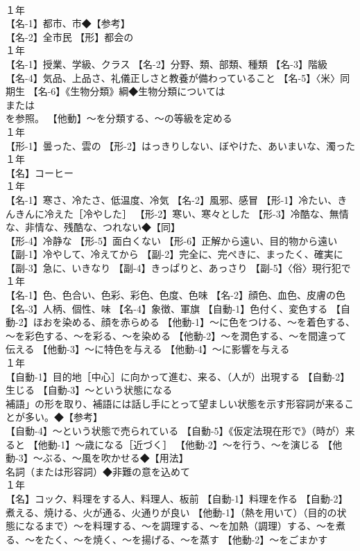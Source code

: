 \documentclass[8pt]{extreport}
\begin{document}
\begin{CJK}{UTF8}{min}
\\	１年	
\\	【名-1】都市、市◆【参考】
\\	【名-2】全市民 【形】都会の
\\	１年	
\\	【名-1】授業、学級、クラス 【名-2】分野、類、部類、種類 【名-3】階級 【名-4】気品、上品さ、礼儀正しさと教養が備わっていること 【名-5】〈米〉同期生 【名-6】《生物分類》綱◆生物分類については 
\\	または 
\\	を参照。 【他動】～を分類する、～の等級を定める
\\	１年	
\\	【形-1】曇った、雲の 【形-2】はっきりしない、ぼやけた、あいまいな、濁った
\\	１年	
\\	【名】コーヒー
\\	１年	
\\	【名-1】寒さ、冷たさ、低温度、冷気 【名-2】風邪、感冒 【形-1】冷たい、きんきんに冷えた［冷やした］ 【形-2】寒い、寒々とした 【形-3】冷酷な、無情な、非情な、残酷な、つれない◆【同】
\\	【形-4】冷静な 【形-5】面白くない 【形-6】正解から遠い、目的物から遠い 【副-1】冷やして、冷えてから 【副-2】完全に、完ぺきに、まったく、確実に 【副-3】急に、いきなり 【副-4】きっぱりと、あっさり 【副-5】〈俗〉現行犯で
\\	１年	
\\	【名-1】色、色合い、色彩、彩色、色度、色味 【名-2】顔色、血色、皮膚の色 【名-3】人柄、個性、味 【名-4】象徴、軍旗 【自動-1】色付く、変色する 【自動-2】ほおを染める、顔を赤らめる 【他動-1】～に色をつける、～を着色する、～を彩色する、～を彩る、～を染める 【他動-2】～を潤色する、～を間違って伝える 【他動-3】～に特色を与える 【他動-4】～に影響を与える
\\	１年	
\\	【自動-1】目的地［中心］に向かって進む、来る、（人が）出現する 【自動-2】生じる 【自動-3】～という状態になる
\\	補語」の形を取り、補語には話し手にとって望ましい状態を示す形容詞が来ることが多い。◆【参考】
\\	【自動-4】～という状態で売られている 【自動-5】《仮定法現在形で》（時が）来ると 【他動-1】～歳になる［近づく］ 【他動-2】～を行う、～を演じる 【他動-3】～ぶる、～風を吹かせる◆【用法】
\\	名詞（または形容詞）◆非難の意を込めて
\\	１年	
\\	【名】コック、料理をする人、料理人、板前 【自動-1】料理を作る 【自動-2】煮える、焼ける、火が通る、火通りが良い 【他動-1】（熱を用いて）（目的の状態になるまで）～を料理する、～を調理する、～を加熱（調理）する、～を煮る、～をたく、～を焼く、～を揚げる、～を蒸す 【他動-2】～をごまかす

\end{CJK}
\end{document}
